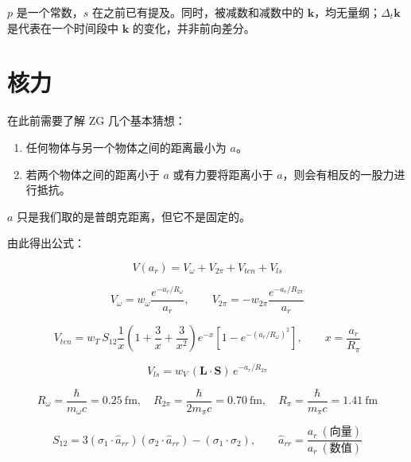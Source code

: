 \documentclass[UTF8]{ctexart}
\begin{document}
\(p\) 是一个常数，\(s\) 在之前已有提及。同时，被减数和减数中的 \(\mathbf{k}\)，均无量纲；\(\Delta_t\mathbf{k}\) 是代表在一个时间段中 \(\mathbf{k}\) 的变化，并非前向差分。

\section{核力}

在此前需要了解 ZG 几个基本猜想：

\begin{enumerate}
\item 任何物体与另一个物体之间的距离最小为 \(a\)。
\item 若两个物体之间的距离小于 \(a\) 或有力要将距离小于 \(a\)，则会有相反的一股力进行抵抗。
\end{enumerate}

\(a\) 只是我们取的是普朗克距离，但它不是固定的。

由此得出公式：

\begin{equation}
V(a_r)=V_{\omega}+V_{2\pi}+V_{ten}+V_{ls}
\end{equation}

\begin{equation}
V_{\omega}=w_{\omega}\frac{e^{-a_r/R_{\omega}}}{a_r},\qquad
V_{2\pi}=-w_{2\pi}\frac{e^{-a_r/R_{2\pi}}}{a_r}
\end{equation}

\begin{equation}
V_{ten}=w_T\,S_{12}\frac{1}{x}\left(1+\frac{3}{x}+\frac{3}{x^2}\right)e^{-x}\left[1-e^{-(a_r/R_{\omega})^2}\right],\qquad x=\frac{a_r}{R_{\pi}}
\end{equation}

\begin{equation}
V_{ls}=w_V\,(\mathbf{L}\cdot\mathbf{S})\,e^{-a_r/R_{2\pi}}
\end{equation}

\begin{equation}
R_{\omega}=\frac{\hbar}{m_{\omega}c}=0.25\ \mathrm{fm},\quad
R_{2\pi}=\frac{\hbar}{2m_{\pi}c}=0.70\ \mathrm{fm},\quad
R_{\pi}=\frac{\hbar}{m_{\pi}c}=1.41\ \mathrm{fm}
\end{equation}

\begin{equation}
S_{12}=3(\sigma_1\cdot\hat a_{rr})(\sigma_2\cdot\hat a_{rr})-(\sigma_1\cdot\sigma_2),\qquad \hat a_{rr}=\frac{a_r\ (\text{向量})}{a_r\ (\text{数值})}
\end{equation}
\end{document}
